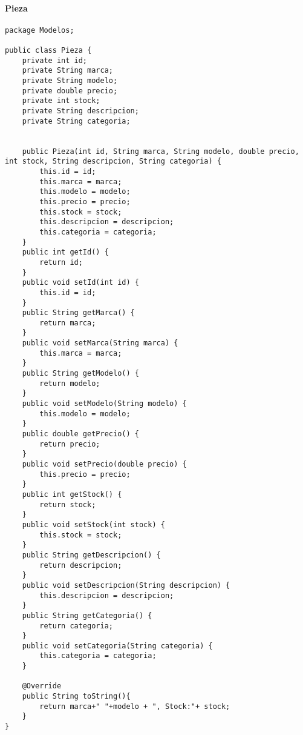 \paragraph{Pieza}
\begin{lstlisting}
package Modelos;

public class Pieza {
	private int id;
	private String marca;
	private String modelo;
	private double precio;
	private int stock;
	private String descripcion;
	private String categoria;
	
	
	public Pieza(int id, String marca, String modelo, double precio, int stock, String descripcion, String categoria) {
		this.id = id;
		this.marca = marca;
		this.modelo = modelo;
		this.precio = precio;
		this.stock = stock;
		this.descripcion = descripcion;
		this.categoria = categoria;
	}
	public int getId() {
		return id;
	}
	public void setId(int id) {
		this.id = id;
	}
	public String getMarca() {
		return marca;
	}
	public void setMarca(String marca) {
		this.marca = marca;
	}
	public String getModelo() {
		return modelo;
	}
	public void setModelo(String modelo) {
		this.modelo = modelo;
	}
	public double getPrecio() {
		return precio;
	}
	public void setPrecio(double precio) {
		this.precio = precio;
	}
	public int getStock() {
		return stock;
	}
	public void setStock(int stock) {
		this.stock = stock;
	}
	public String getDescripcion() {
		return descripcion;
	}
	public void setDescripcion(String descripcion) {
		this.descripcion = descripcion;
	}
	public String getCategoria() {
		return categoria;
	}
	public void setCategoria(String categoria) {
		this.categoria = categoria;
	}
	
	@Override
	public String toString(){
		return marca+" "+modelo + ", Stock:"+ stock;
	}
}
\end{lstlisting}
\clearpage

